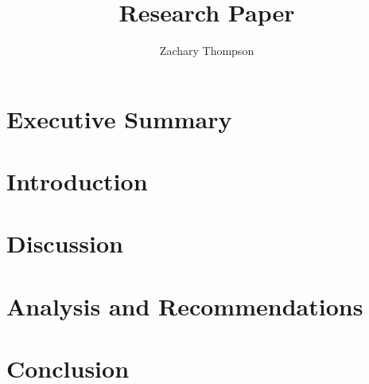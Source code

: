 \documentclass[12pt, letterpaper]{article}
\title{Research Paper}
\author{Zachary Thompson}
\begin{document}
\maketitle

\section{Executive Summary}
\section{Introduction}
\section{Discussion}
\section{Analysis and Recommendations}
\section{Conclusion}

\printbibliography
\end{document}
